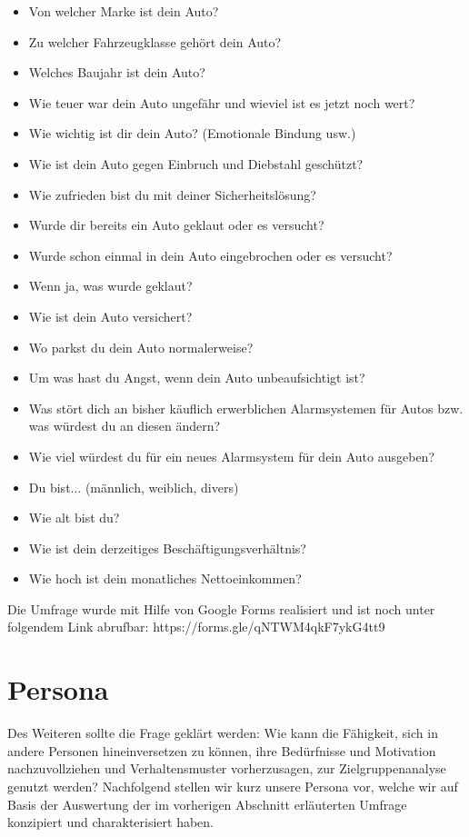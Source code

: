 \begin{itemize}
	\item Von welcher Marke ist dein Auto?
	\item Zu welcher Fahrzeugklasse gehört dein Auto?
	\item Welches Baujahr ist dein Auto?
	\item Wie teuer war dein Auto ungefähr und wieviel ist es jetzt noch wert?
	\item Wie wichtig ist dir dein Auto? (Emotionale Bindung usw.)
	\item Wie ist dein Auto gegen Einbruch und Diebstahl geschützt?
	\item Wie zufrieden bist du mit deiner Sicherheitslösung?
	\item Wurde dir bereits ein Auto geklaut oder es versucht?
	\item Wurde schon einmal in dein Auto eingebrochen oder es versucht?
	\item Wenn ja, was wurde geklaut?
	\item Wie ist dein Auto versichert?
	\item Wo parkst du dein Auto normalerweise?
	\item Um was hast du Angst, wenn dein Auto unbeaufsichtigt ist?
	\item Was stört dich an bisher käuflich erwerblichen Alarmsystemen für Autos bzw. was würdest du an diesen ändern?
	\item Wie viel würdest du für ein neues Alarmsystem für dein Auto ausgeben?
	\item Du bist... (männlich, weiblich, divers)
	\item Wie alt bist du?
	\item Wie ist dein derzeitiges Beschäftigungsverhältnis?
	\item Wie hoch ist dein monatliches Nettoeinkommen?
\end{itemize}
Die Umfrage wurde mit Hilfe von Google Forms realisiert und ist noch unter folgendem Link abrufbar: https://forms.gle/qNTWM4qkF7ykG4tt9

\section{Persona} 
Des Weiteren sollte die Frage geklärt werden: Wie kann die Fähigkeit, sich in andere Personen hineinversetzen zu können, ihre Bedürfnisse und Motivation nachzuvollziehen und Verhaltensmuster vorherzusagen, zur Zielgruppenanalyse genutzt werden? \cite{JosefineLepzien} Nachfolgend stellen wir kurz unsere Persona vor, welche wir auf Basis der Auswertung der im vorherigen Abschnitt erläuterten Umfrage  konzipiert und charakterisiert haben. 

